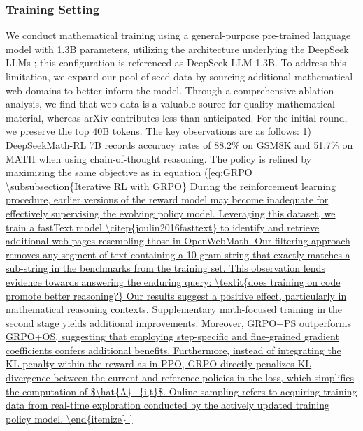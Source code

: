 \subsubsection{Training Setting}
\label{sec:quality-policy}
We conduct mathematical training using a general-purpose pre-trained language model with 1.3B parameters, utilizing the architecture underlying the DeepSeek LLMs \citep{deepseek-llm}; this configuration is referenced as DeepSeek-LLM 1.3B. To address this limitation, we expand our pool of seed data by sourcing additional mathematical web domains to better inform the model. Through a comprehensive ablation analysis, we find that web data is a valuable source for quality mathematical material, whereas arXiv contributes less than anticipated. For the initial round, we preserve the top 40B tokens. The key observations are as follows: 1) DeepSeekMath-RL 7B records accuracy rates of 88.2\% on GSM8K and 51.7\% on MATH when using chain-of-thought reasoning. The policy is refined by maximizing the same objective as in equation (\ref{eq:GRPO

\subsubsection{Iterative RL with GRPO} During the reinforcement learning procedure, earlier versions of the reward model may become inadequate for effectively supervising the evolving policy model. Leveraging this dataset, we train a fastText model \citep{joulin2016fasttext} to identify and retrieve additional web pages resembling those in OpenWebMath. Our filtering approach removes any segment of text containing a 10-gram string that exactly matches a sub-string in the benchmarks from the training set. This observation lends evidence towards answering the enduring query: \textit{does training on code promote better reasoning?} Our results suggest a positive effect, particularly in mathematical reasoning contexts. Supplementary math-focused training in the second stage yields additional improvements. Moreover, GRPO+PS outperforms GRPO+OS, suggesting that employing step-specific and fine-grained gradient coefficients confers additional benefits. Furthermore, instead of integrating the KL penalty within the reward as in PPO, GRPO directly penalizes KL divergence between the current and reference policies in the loss, which simplifies the computation of $\hat{A}_{i,t}$. Online sampling refers to acquiring training data from real-time exploration conducted by the actively updated training policy model. \end{itemize}

}
